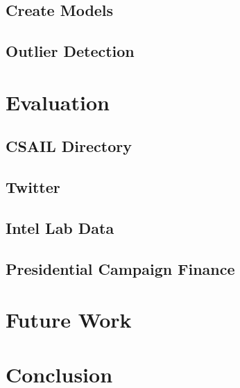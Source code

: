\documentclass{vldb}
\begin{document}
\subsection{Create Models}
\label{sec:model_creation}

\subsection{Outlier Detection}
\label{sec:outlier_detection}


\section{Evaluation}
\label{sec:eval}

\subsection{CSAIL Directory}
\label{sec:csail}


\subsection{Twitter}

\subsection{Intel Lab Data}
\label{sec:intel}


\subsection{Presidential Campaign Finance}
\label{sec:president}


\section{Future Work}
\label{sec:future}



\section{Conclusion}
\label{sec:concl}








\end{document}
